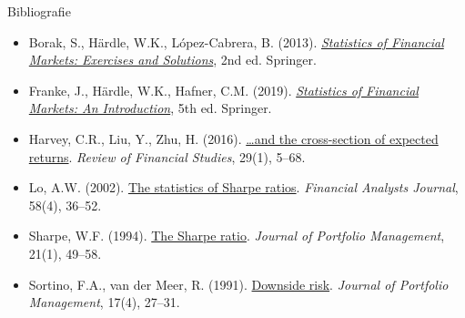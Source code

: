 \begin{frame}{Bibliografie}
\itemsize{\tiny}
\begin{itemize}
    \item Borak, S., Härdle, W.K., López-Cabrera, B. (2013). \href{https://doi.org/10.1007/978-3-642-33929-5}{\textit{Statistics of Financial Markets: Exercises and Solutions}}, 2nd ed. Springer.
    \item Franke, J., Härdle, W.K., Hafner, C.M. (2019). \href{https://doi.org/10.1007/978-3-030-13751-9}{\textit{Statistics of Financial Markets: An Introduction}}, 5th ed. Springer.
    \item Harvey, C.R., Liu, Y., Zhu, H. (2016). \href{https://doi.org/10.1093/rfs/hhv059}{\ldots and the cross-section of expected returns}. \textit{Review of Financial Studies}, 29(1), 5--68.
    \item Lo, A.W. (2002). \href{https://doi.org/10.2469/faj.v58.n4.2453}{The statistics of Sharpe ratios}. \textit{Financial Analysts Journal}, 58(4), 36--52.
    \item Sharpe, W.F. (1994). \href{https://doi.org/10.3905/jpm.1994.409501}{The Sharpe ratio}. \textit{Journal of Portfolio Management}, 21(1), 49--58.
    \item Sortino, F.A., van der Meer, R. (1991). \href{https://doi.org/10.3905/jpm.1991.409343}{Downside risk}. \textit{Journal of Portfolio Management}, 17(4), 27--31.
\end{itemize}
\end{frame}


